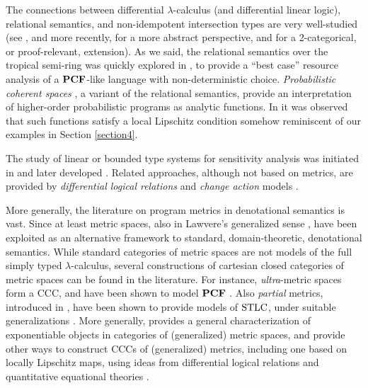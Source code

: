 
The connections between differential $\lambda$-calculus (and differential linear logic), relational semantics, and non-idempotent intersection types are very well-studied (see \cite{decarvalho2018}, and more recently, \cite{Mazza2016} for a more abstract perspective, and \cite{Olimpieri2021, Galal2021} for a 2-categorical, or proof-relevant, extension).
As we said, the relational semantics over the tropical semi-ring was quickly explored in \cite{Manzo2013}, to provide a ``best case'' resource analysis of a $\mathbf{PCF}$-like language with non-deterministic choice. 
\emph{Probabilistic coherent spaces} \cite{Ehrhard2011}, a variant of  the relational semantics, provide an interpretation of higher-order probabilistic programs
as analytic functions. In \cite{Ehrhard2022} it was observed that such functions satisfy a local Lipschitz condition somehow reminiscent of our examples in Section \ref{section4}.


The study of linear or bounded type systems for sensitivity analysis was initiated in \cite{Girard92tcs} and later developed \cite{Schopp, SchoppDalLago, Reed2010}.
Related approaches, although not based on metrics, are provided by \emph{differential logical relations} \cite{dallago} and \emph{change action} models \cite{Picallo2019}.


More generally, the literature on program metrics in denotational semantics is vast. Since at least \cite{VANBREUGEL20011} metric spaces, also in Lawvere's generalized sense \cite{Lawvere1973}, have been exploited as an alternative framework to standard, domain-theoretic, denotational semantics. 
While standard categories of metric spaces are not models of the full simply typed $\lambda$-calculus, several constructions of cartesian closed categories of metric spaces can be found in the literature. For instance, 
\emph{ultra}-metric spaces form a CCC, and have been shown to model $\mathbf{PCF}$ \cite{Escardo1999}.
Also \emph{partial} metrics, introduced in \cite{matthews}, have been shown to provide models of $\mathrm{STLC}$, under suitable generalizations \cite{Geoffroy2020}.
More generally, \cite{Clementino2006} provides a general characterization of exponentiable objects in categories of (generalized) metric spaces, and \cite{PistoneLICS, PistoneFSCD2022} provide other ways to construct CCCs of
(generalized) metrics, including one based on locally Lipschitz maps, 
using ideas from {differential logical relations} and quantitative equational theories \cite{Plotk}.

